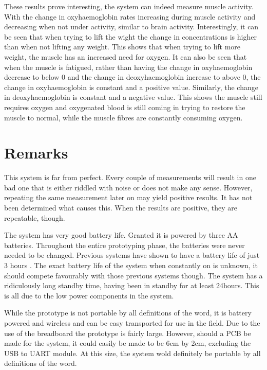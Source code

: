 These results prove interesting, the system can indeed measure muscle activity. With the change in oxyhaemoglobin rates increasing during muscle activity and decreasing when not under activity, similar to brain activity. Interestingly, it can be seen that when trying to lift the wight the change in concentrations is higher than when not lifting any weight. This shows that when trying to lift more weight, the muscle has an increased need for oxygen. It can also be seen that when the muscle is fatigued, rather than having the change in oxyhaemoglobin decrease to below 0 and the change in deoxyhaemoglobin increase to above 0, the change in oxyhaemoglobin is constant and a positive value. Similarly, the change in deoxyhaemoglobin is constant and a negative value. This shows the muscle still requires oxygen and oxygenated blood is still coming in trying to restore the muscle to normal, while the muscle fibres are constantly consuming oxygen.

\section{Remarks}

This system is far from perfect. Every couple of measurements will result in one bad one that is either riddled with noise or does not make any sense. However, repeating the same measurement later on may yield positive results. It has not been determined what causes this. When the results are positive, they are repeatable, though.

The system has very good battery life. Granted it is powered by three AA batteries. Throughout the entire prototyping phase, the batteries were never needed to be changed. Previous systems have shown to have a battery life of just 3 hours \cite{rosen05}. The exact battery life of the system when constantly on is unknown, it should compete favourably with those previous systems though. The system has a ridiculously long standby time, having been in standby for at least 24hours. This is all due to the low power components in the system. 

While the prototype is not portable by all definitions of the word, it is battery powered and wireless and can be easy transported for use in the field. Due to the use of the breadboard the prototype is fairly large. However, should a PCB be made for the system, it could easily be made to be 6cm by 2cm, excluding the USB to UART module. At this size, the system wold definitely be portable by all definitions of the word. 